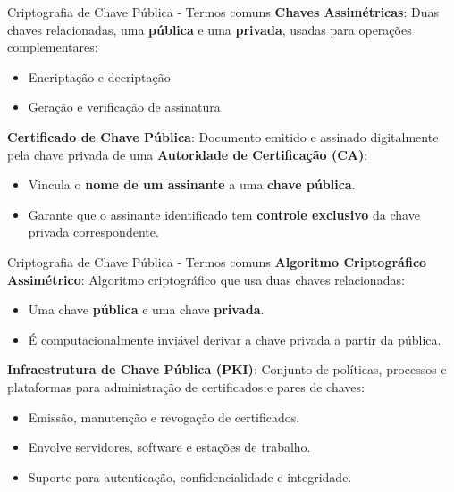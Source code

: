 \begin{frame}{Criptografia de Chave Pública - Termos comuns}
  \textbf{Chaves Assimétricas}:   Duas chaves relacionadas, uma \textbf{pública} e uma \textbf{privada}, usadas para operações complementares:
  \begin{itemize}
    \item Encriptação e decriptação
    \item Geração e verificação de assinatura
  \end{itemize}


  \textbf{Certificado de Chave Pública}: Documento emitido e assinado digitalmente pela chave privada de uma \textbf{Autoridade de Certificação (CA)}:
  \begin{itemize}
    \item Vincula o \textbf{nome de um assinante} a uma \textbf{chave pública}.
    \item Garante que o assinante identificado tem \textbf{controle exclusivo} da chave privada correspondente.
  \end{itemize}
\end{frame}
\begin{frame}{Criptografia de Chave Pública - Termos comuns}
  \textbf{Algoritmo Criptográfico Assimétrico}: Algoritmo criptográfico que usa duas chaves relacionadas:
  \begin{itemize}
    \item Uma chave \textbf{pública} e uma chave \textbf{privada}.
    \item É computacionalmente inviável derivar a chave privada a partir da pública.
  \end{itemize}


  \textbf{Infraestrutura de Chave Pública (PKI)}: Conjunto de políticas, processos e plataformas para administração de certificados e pares de chaves:
  \begin{itemize}
    \item Emissão, manutenção e revogação de certificados.
    \item Envolve servidores, software e estações de trabalho.
    \item Suporte para autenticação, confidencialidade e integridade.
  \end{itemize}
\end{frame}

